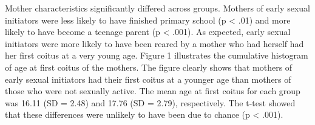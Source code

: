 \documentclass[
]{article}
\begin{document}
Mother characteristics significantly differed across groups. Mothers of
early sexual initiators were less likely to have finished primary school
(p \textless{} .01) and more likely to have become a teenage parent (p
\textless{} .001). As expected, early sexual initiators were more likely
to have been reared by a mother who had herself had her first coitus at
a very young age. Figure 1 illustrates the cumulative histogram of age
at first coitus of the mothers. The figure clearly shows that mothers of
early sexual initiators had their first coitus at a younger age than
mothers of those who were not sexually active. The mean age at first
coitus for each group was 16.11 (SD = 2.48) and 17.76 (SD = 2.79),
respectively. The t-test showed that these differences were unlikely to
have been due to chance (p \textless{} .001).
\end{document}
